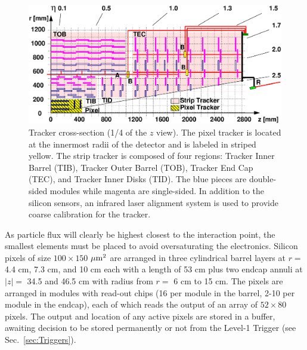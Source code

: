 \begin{figure}[htbp]
\begin{center}
\includegraphics[width=.8\linewidth]{Experiment/figures/TrackerSystemLAS.eps}
\caption[Geometry of the Tracker System]{Tracker cross-section (1/4 of the $z$ view). The pixel tracker is located at the innermost radii of the detector and is labeled in striped yellow. The strip tracker is composed of four regions: Tracker Inner Barrel (TIB), Tracker Outer Barrel (TOB), Tracker End Cap (TEC), and Tracker Inner Disks (TID). The blue pieces are double-sided modules while magenta are single-sided. In addition to the silicon sensors, an infrared laser alignment system is used to provide coarse calibration for the tracker.}
\label{fig:TrackerSystem}
\end{center}
\end{figure}

As particle flux will clearly be highest closest to the interaction point, the smallest elements must be placed to avoid oversaturating the electronics. Silicon pixels of size $100\times150$ $\mu\rm{m}^2$ are arranged in three cylindrical barrel layers at $r=$ 4.4 cm, 7.3 cm, and 10 cm each with a length of 53 cm plus two endcap annuli at $|z|=$ 34.5 and 46.5 cm with radius from $r=$ 6 cm to 15 cm. The pixels are arranged in modules with read-out chips (16 per module in the barrel, 2-10 per module in the endcap), each of which reads the output of an array of $52\times80$ pixels. The output and location of any active pixels are stored in a buffer, awaiting decision to be stored permanently or not from the Level-1 Trigger (see Sec.~\ref{sec:Triggers}).

